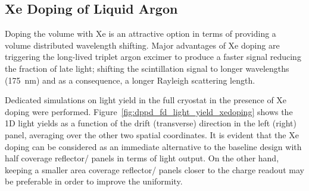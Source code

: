 \subsection{Xe Doping of Liquid Argon}
\label{sec:dp-pds-appendix-xedoping}

Doping the  volume with Xe is an attractive option in terms of providing a volume distributed wavelength shifting. Major advantages of Xe doping are triggering the long-lived triplet argon excimer to produce a faster signal reducing the fraction of late light; shifting the scintillation signal to longer wavelengths (\SI{175}{nm}) and as a consequence, a longer Rayleigh scattering length.

Dedicated simulations on light yield in the full   cryostat in the presence of Xe doping were performed. Figure~\ref{fig:dppd_fd_light_yield_xedoping} shows the 1D light yields as a function of the drift (transverse) direction in the left (right) panel, averaging over the other two spatial coordinates. It is evident that the Xe doping can be considered as an immediate alternative to the baseline design with half coverage reflector/ panels in terms of light output. On the other hand, keeping a smaller area coverage reflector/ panels closer to the charge readout may be preferable in order to improve the uniformity.




